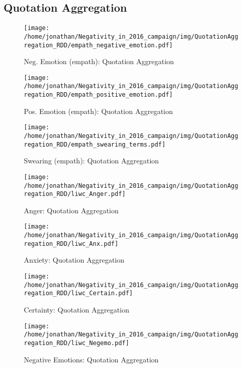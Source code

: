 \subsection{Quotation Aggregation}

\begin{figure}[h]\centering
	\texttt{[image: /home/jonathan/Negativity\_in\_2016\_campaign/img/QuotationAggregation\_RDD/empath\_negative\_emotion.pdf]}
	\caption{Neg. Emotion (empath): Quotation Aggregation}
	\label{fig: qa_Neg. Emotion (empath)}
\end{figure}

\begin{figure}[h]\centering
	\texttt{[image: /home/jonathan/Negativity\_in\_2016\_campaign/img/QuotationAggregation\_RDD/empath\_positive\_emotion.pdf]}
	\caption{Pos. Emotion (empath): Quotation Aggregation}
	\label{fig: qa_Pos. Emotion (empath)}
\end{figure}

\begin{figure}[h]\centering
	\texttt{[image: /home/jonathan/Negativity\_in\_2016\_campaign/img/QuotationAggregation\_RDD/empath\_swearing\_terms.pdf]}
	\caption{Swearing (empath): Quotation Aggregation}
	\label{fig: qa_Swearing (empath)}
\end{figure}

\begin{figure}[h]\centering
	\texttt{[image: /home/jonathan/Negativity\_in\_2016\_campaign/img/QuotationAggregation\_RDD/liwc\_Anger.pdf]}
	\caption{Anger: Quotation Aggregation}
	\label{fig: qa_Anger}
\end{figure}

\begin{figure}[h]\centering
	\texttt{[image: /home/jonathan/Negativity\_in\_2016\_campaign/img/QuotationAggregation\_RDD/liwc\_Anx.pdf]}
	\caption{Anxiety: Quotation Aggregation}
	\label{fig: qa_Anxiety}
\end{figure}

\begin{figure}[h]\centering
	\texttt{[image: /home/jonathan/Negativity\_in\_2016\_campaign/img/QuotationAggregation\_RDD/liwc\_Certain.pdf]}
	\caption{Certainty: Quotation Aggregation}
	\label{fig: qa_Certainty}
\end{figure}

\begin{figure}[h]\centering
	\texttt{[image: /home/jonathan/Negativity\_in\_2016\_campaign/img/QuotationAggregation\_RDD/liwc\_Negemo.pdf]}
	\caption{Negative Emotions: Quotation Aggregation}
	\label{fig: qa_Negative Emotions}
\end{figure}

